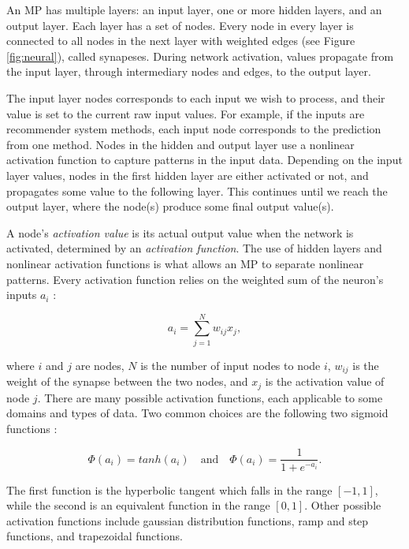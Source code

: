 An MP has multiple layers: an input layer, one or more hidden layers, and an output layer.
Each layer has a set of nodes.
Every node in every layer is connected to all nodes in the next layer
with weighted edges (see Figure \ref{fig:neural}), called synapeses.
During network activation, values propagate from the input layer, through intermediary nodes and edges,
to the output layer. 

The input layer nodes corresponds to each input we wish to process,
and their value is set to the current raw input values.
For example, if the inputs are recommender system methods,
each input node corresponds to the prediction from one method.
Nodes in the hidden and output layer use a nonlinear activation function 
to capture patterns in the input data.
Depending on the input layer values, nodes in the first hidden layer
are either activated or not, and propagates some value to the 
following layer. This continues until we reach the output layer,
where the node(s) produce some final output value(s).



A node's \emph{activation value} is its actual output value when the network is activated,
determined by an \emph{activation function}.
The use of hidden layers and nonlinear activation functions is what allows an MP
to separate nonlinear patterns. 
Every activation function relies on the weighted sum of the neuron's inputs $a_i$
\cite[p178]{Floreano2008}:

\begin{equation*}
  a_i = \sum_{j=1}^{N} w_{ij} x_j,
\end{equation*}

where $i$ and $j$ are nodes, $N$ is the number of input nodes to node $i$,
$w_{ij}$ is the weight of the synapse between the two nodes,
and $x_{j}$ is the activation value of node $j$.
There are many possible activation functions,
each applicable to some domains and types of data.
Two common choices are the following two sigmoid functions
\cite[p179-180]{Floreano2008}:

\begin{equation*}
  \Phi(a_i) = tanh(a_i) \quad \text{and} \quad \Phi(a_i) = \frac{1}{1 + e^{-a_i}}.
\end{equation*}

The first function is the hyperbolic tangent which falls in the range $[-1,1]$,
while the second is an equivalent function in the range $[0,1]$.
Other possible activation functions include
gaussian distribution functions, ramp and step functions, and trapezoidal
functions.

